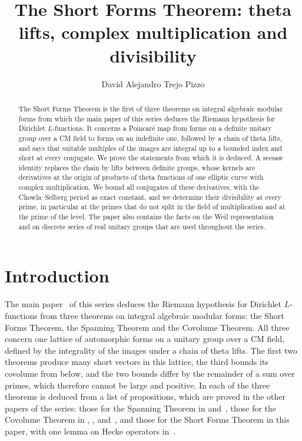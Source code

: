 \documentclass[10pt]{amsart}
\theoremstyle{definition}
\theoremstyle{remark}
\begin{document}
\addtolength{\abovedisplayskip}{-3.4pt}
\addtolength{\belowdisplayskip}{-3.4pt}
\addtolength{\belowdisplayshortskip}{-2pt}
\title[The Short Forms Theorem]{The Short Forms Theorem: theta lifts, complex multiplication and divisibility}
\author{David Alejandro Trejo Pizzo}
\date{}
\begin{abstract}
The Short Forms Theorem is the first of three theorems on integral algebraic modular forms from
which the main paper of this series deduces the Riemann hypothesis for Dirichlet $L$-functions.
It concerns a Poincar\'e map from forms on a definite unitary group over a CM field to forms on an
indefinite one, followed by a chain of theta lifts, and says that suitable multiples of the images
are integral up to a bounded index and short at every conjugate. We prove the statements from which
it is deduced. A seesaw identity replaces the chain by lifts between definite groups, whose kernels
are derivatives at the origin of products of theta functions of one elliptic curve with complex
multiplication. We bound all conjugates of these derivatives, with the Chowla--Selberg period as
exact constant, and we determine their divisibility at every prime, in particular at the primes
that do not split in the field of multiplication and at the prime of the level. The paper also
contains the facts on the Weil representation and on discrete series of real unitary groups that
are used throughout the series.
\end{abstract}
\maketitle
\setcounter{tocdepth}{1}\tableofcontents

\section{Introduction}\label{A1:intro}

The main paper~\cite{P46} of this series deduces the Riemann hypothesis for Dirichlet
$L$-functions from three theorems on integral algebraic modular forms: the Short Forms Theorem,
the Spanning Theorem and the Covolume Theorem. All three concern one lattice of automorphic forms
on a unitary group over a CM field, defined by the integrality of the images under a chain of
theta lifts. The first two theorems produce many short vectors in this lattice, the third bounds
its covolume from below, and the two bounds differ by the remainder of a sum over primes, which
therefore cannot be large and positive. In \cite{P46} each of the three theorems is deduced from a
list of propositions, which are proved in the other papers of the series: those for the Spanning
Theorem in \cite{P51} and~\cite{P52}, those for the Covolume Theorem in \cite{P53}, \cite{P54},
\cite{P55} and~\cite{P56}, and those for the Short Forms Theorem in this paper, with one
lemma on Hecke operators in~\cite{P50}.
\end{document}
